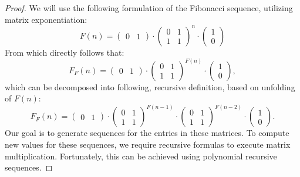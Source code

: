 \documentclass[en]{pracamgr}
\theoremstyle{definition}
\begin{document}
\begin{proof}
    We will use the following formulation of the Fibonacci sequence, utilizing matrix exponentiation:
    $$F(n) = 
    \begin{pmatrix}
        0 & 1 
    \end{pmatrix}
    \cdot
    \begin{pmatrix}
        0 & 1\\ 
        1 & 1
    \end{pmatrix}^n
    \cdot
    \begin{pmatrix}
        1 \\
        0 
    \end{pmatrix}
    $$
    From which directly follows that:
    $$F_F(n) = 
    \begin{pmatrix}
        0 & 1 
    \end{pmatrix}
    \cdot
    \begin{pmatrix}
        0 & 1\\ 
        1 & 1
    \end{pmatrix}^{F(n)}
    \cdot
    \begin{pmatrix}
        1 \\
        0 
    \end{pmatrix},
    $$
    which can be decomposed into following, recursive definition, based on unfolding of $F(n)$:
    $$F_F(n) = 
    \begin{pmatrix}
        0 & 1 
    \end{pmatrix}
    \cdot
    \begin{pmatrix}
        0 & 1\\ 
        1 & 1
    \end{pmatrix}^{F(n-1)}
    \cdot
    \begin{pmatrix}
        0 & 1\\ 
        1 & 1
    \end{pmatrix}^{F(n-2)}
    \cdot
    \begin{pmatrix}
        1 \\
        0 
    \end{pmatrix}.
    $$
    Our goal is to generate sequences for the entries in these matrices. To compute new values for these sequences, we require recursive formulas to execute matrix multiplication. Fortunately, this can be achieved using polynomial recursive sequences.


\end{proof}
\end{document}
